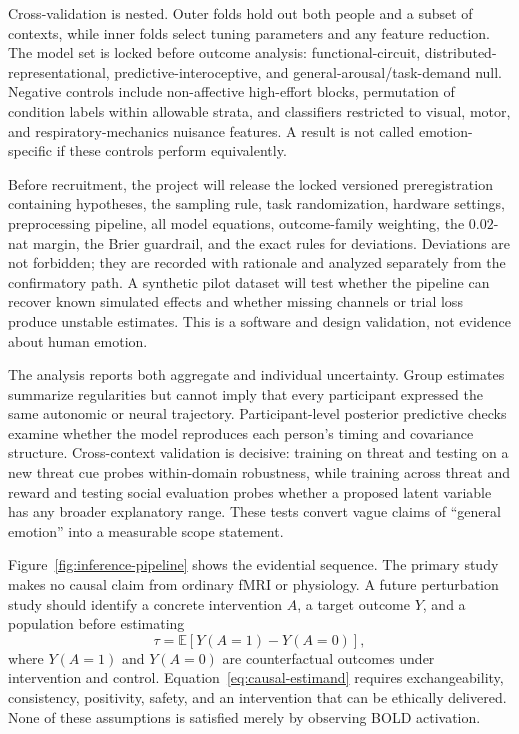 \documentclass[conference]{IEEEtran}
\begin{document}
Cross-validation is nested. Outer folds hold out both people and a subset of contexts, while inner folds select tuning parameters and any feature reduction. The model set is locked before outcome analysis: functional-circuit, distributed-representational, predictive-interoceptive, and general-arousal/task-demand null. Negative controls include non-affective high-effort blocks, permutation of condition labels within allowable strata, and classifiers restricted to visual, motor, and respiratory-mechanics nuisance features. A result is not called emotion-specific if these controls perform equivalently.

Before recruitment, the project will release the locked versioned preregistration containing hypotheses, the sampling rule, task randomization, hardware settings, preprocessing pipeline, all model equations, outcome-family weighting, the $0.02$-nat margin, the Brier guardrail, and the exact rules for deviations. Deviations are not forbidden; they are recorded with rationale and analyzed separately from the confirmatory path. A synthetic pilot dataset will test whether the pipeline can recover known simulated effects and whether missing channels or trial loss produce unstable estimates. This is a software and design validation, not evidence about human emotion.

The analysis reports both aggregate and individual uncertainty. Group estimates summarize regularities but cannot imply that every participant expressed the same autonomic or neural trajectory. Participant-level posterior predictive checks examine whether the model reproduces each person's timing and covariance structure. Cross-context validation is decisive: training on threat and testing on a new threat cue probes within-domain robustness, while training across threat and reward and testing social evaluation probes whether a proposed latent variable has any broader explanatory range. These tests convert vague claims of ``general emotion'' into a measurable scope statement.

Figure~\ref{fig:inference-pipeline} shows the evidential sequence. The primary study makes no causal claim from ordinary fMRI or physiology. A future perturbation study should identify a concrete intervention $A$, a target outcome $Y$, and a population before estimating
\begin{equation}
\tau=\mathbb{E}\left[Y\left(A=1\right)-Y\left(A=0\right)\right],
\label{eq:causal-estimand}
\end{equation}
where $Y(A=1)$ and $Y(A=0)$ are counterfactual outcomes under intervention and control. Equation~\eqref{eq:causal-estimand} requires exchangeability, consistency, positivity, safety, and an intervention that can be ethically delivered. None of these assumptions is satisfied merely by observing BOLD activation.
\end{document}

